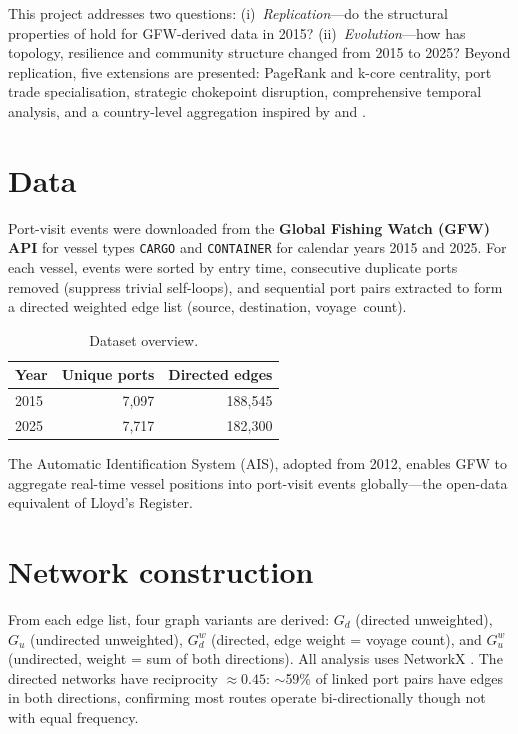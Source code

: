 \documentclass[a4paper,10pt,twocolumn]{article}
\begin{document}
This project addresses two questions:
(i)~\textit{Replication}---do the structural properties of
\citet{Kaluza2010} hold for GFW-derived data in 2015?
(ii)~\textit{Evolution}---how has topology, resilience and community
structure changed from 2015 to 2025?
Beyond replication, five extensions are presented: PageRank and
k-core centrality, port trade specialisation, strategic chokepoint
disruption, comprehensive temporal analysis, and a country-level
aggregation inspired by \citet{Ducruet2022} and \citet{Liu2025}.

\section{Data}

Port-visit events were downloaded from the \textbf{Global Fishing
Watch (GFW) API} for vessel types \texttt{CARGO} and
\texttt{CONTAINER} for calendar years 2015 and 2025.
For each vessel, events were sorted by entry time, consecutive
duplicate ports removed (suppress trivial self-loops), and
sequential port pairs extracted to form a directed weighted edge list
(source, destination, voyage~count).

\begin{table}[t]
\centering
\caption{Dataset overview.}
\label{tab:data}
{\small
\begin{tabular}{@{}lrr@{}}
\toprule
\rowcolor{TableH}
\textbf{Year} & \textbf{Unique ports} & \textbf{Directed edges} \\
\midrule
2015 & 7,097 & 188,545 \\
2025 & 7,717 & 182,300 \\
\bottomrule
\end{tabular}}
\end{table}

The Automatic Identification System (AIS), adopted from 2012, enables
GFW to aggregate real-time vessel positions into port-visit events
globally---the open-data equivalent of Lloyd's Register.

\section{Network construction}

From each edge list, four graph variants are derived:
$G_d$ (directed unweighted), $G_u$ (undirected unweighted),
$G_d^w$ (directed, edge weight = voyage count), and
$G_u^w$ (undirected, weight = sum of both directions).
All analysis uses NetworkX \citep{Hagberg2008}.
The directed networks have reciprocity $\approx\!0.45$: $\sim$59\%
of linked port pairs have edges in both directions, confirming
most routes operate bi-directionally though not with equal frequency.
\end{document}

